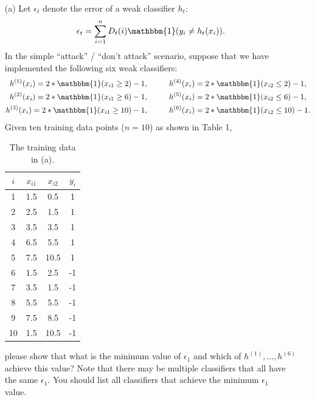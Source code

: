 \documentclass[10pt]{article}
\begin{document}
\begin{enumerate}
	      \begin{itemize}
		      \item[(a)] Let $\epsilon_t$ denote the error of a weak classifier $h_t$:
		            \begin{align*}
			            \epsilon_{t} = \sum_{i=1}^{n} D_{t}(i) \mathbbm{1}(y_{i} \neq h_{t}(x_{i})).
		            \end{align*}
		            In the simple “attack” / “don’t attack” scenario, suppose that we have implemented the following six weak classifiers:
		            \begin{align*}
			            h^{(1)}(x_{i}) = 2 * \mathbbm{1}(x_{i1} \geq 2) - 1, \hspace{1cm}  & h^{(4)}(x_{i}) = 2 * \mathbbm{1}(x_{i2} \leq 2) - 1,  \\
			            h^{(2)}(x_{i}) = 2 * \mathbbm{1}(x_{i1} \geq 6) - 1, \hspace{1cm}  & h^{(5)}(x_{i}) = 2 * \mathbbm{1}(x_{i2} \leq 6) - 1,  \\
			            h^{(3)}(x_{i}) = 2 * \mathbbm{1}(x_{i1} \geq 10) - 1, \hspace{1cm} & h^{(6)}(x_{i}) = 2 * \mathbbm{1}(x_{i2} \leq 10) - 1. \\
		            \end{align*}
		            Given ten training data points ($n = 10$) as shown in Table 1,
		            \begin{table}[t]
			            \caption{The training data in (a).}
			            \label{table1}
			            \centering
			            \begin{tabular}{|c|cc|c|}
				            \hline
				            $i$ & $x_{i1}$ & $x_{i2}$ & $y_{i}$ \\ \hline
				            1   & 1.5      & 0.5      & 1       \\
				            2   & 2.5      & 1.5      & 1       \\
				            3   & 3.5      & 3.5      & 1       \\
				            4   & 6.5      & 5.5      & 1       \\
				            5   & 7.5      & 10.5     & 1       \\
				            6   & 1.5      & 2.5      & -1      \\
				            7   & 3.5      & 1.5      & -1      \\
				            8   & 5.5      & 5.5      & -1      \\
				            9   & 7.5      & 8.5      & -1      \\
				            10  & 1.5      & 10.5     & -1      \\
				            \hline
			            \end{tabular}
		            \end{table}
		            please show that what is the minimum value of $\epsilon_{1}$ and which of $h^{(1)},...,h^{(6)}$ achieve this value? Note that there may be multiple classifiers that all have the same $\epsilon_{1}$. You should list all classifiers that achieve the minimum $\epsilon_{1}$ value.~\\


\end{itemize}
\end{enumerate}
\end{document}
